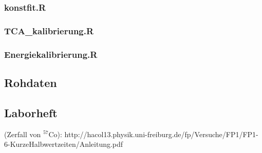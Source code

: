 \documentclass[12pt]{article}
\begin{document}
\subsubsection*{konstfit.R}

\subsubsection*{TCA\_kalibrierung.R}

\subsubsection*{Energiekalibrierung.R}

\subsection{Rohdaten}

%


%

\newpage
\subsection{Laborheft}

\newpage
\listoffigures


\newpage
\thispagestyle{empty}
\begin{thebibliography}{9}

 (Zerfall von $^{57}$Co): http://hacol13.physik.uni-freiburg.de/fp/Versuche/FP1/FP1-6-KurzeHalbwertzeiten/Anleitung.pdf
  

  
  

\end{thebibliography}
\end{document}
